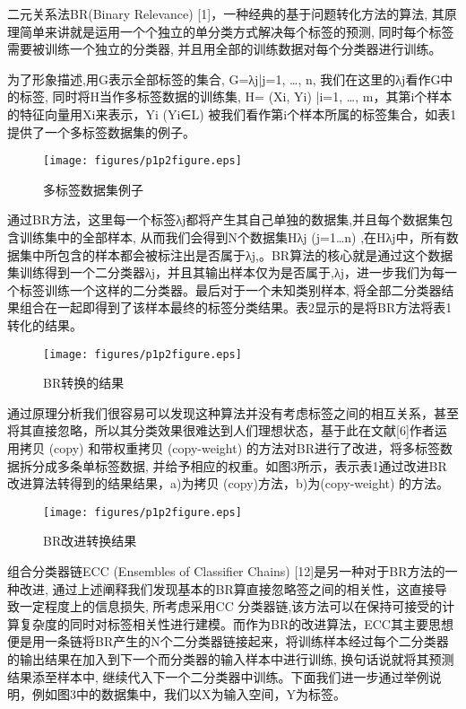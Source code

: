 二元关系法BR(Binary Relevance) [1]，一种经典的基于问题转化方法的算法, 其原理简单来讲就是运用一个个独立的单分类方式解决每个标签的预测, 同时每个标签需要被训练一个独立的分类器, 并且用全部的训练数据对每个分类器进行训练。

为了形象描述,用G表示全部标签的集合, G={λj|j=1, …, n}, 我们在这里的λj看作G中的标签, 同时将H当作多标签数据的训练集, H={ (Xi, Yi) |i=1, …, m}，其第i个样本的特征向量用Xi来表示，Yi (Yi∈L) 被我们看作第i个样本所属的标签集合，如表1提供了一个多标签数据集的例子。

\begin{figure}[htbp!]
	\centering
	\texttt{[image: figures/p1p2figure.eps]}
	\caption{多标签数据集例子}\label{fig:simuP1P2Result}
	\vspace{-1em}
\end{figure}

通过BR方法，这里每一个标签λj都将产生其自己单独的数据集,并且每个数据集包含训练集中的全部样本, 从而我们会得到N个数据集Hλj (j=1…n) ,在Hλj中，所有数据集中所包含的样本都会被标注出是否属于λj,。BR算法的核心就是通过这个数据集训练得到一个二分类器λj，并且其输出样本仅为是否属于,λj，进一步我们为每一个标签训练一个这样的二分类器。最后对于一个未知类别样本, 将全部二分类器结果组合在一起即得到了该样本最终的标签分类结果。表2显示的是将BR方法将表1转化的结果。

\begin{figure}[htbp!]
	\centering
	\texttt{[image: figures/p1p2figure.eps]}
	\caption{BR转换的结果}\label{fig:simuP1P2Result}
	\vspace{-1em}
\end{figure}

通过原理分析我们很容易可以发现这种算法并没有考虑标签之间的相互关系，甚至将其直接忽略，所以其分类效果很难达到人们理想状态，基于此在文献[6]作者运用拷贝 (copy) 和带权重拷贝 (copy-weight) 的方法对BR进行了改进，将多标签数据拆分成多条单标签数据, 并给予相应的权重。如图3所示，表示表1通过改进BR改进算法转得到的结果结果，a)为拷贝 (copy)方法，b)为(copy-weight) 的方法。

\begin{figure}[htbp!]
	\centering
	\texttt{[image: figures/p1p2figure.eps]}
	\caption{BR改进转换结果}\label{fig:simuP1P2Result}
	\vspace{-1em}
\end{figure}

组合分类器链ECC (Ensembles of Classifier Chains) [12]是另一种对于BR方法的一种改进, 通过上述阐释我们发现基本的BR算直接忽略签之间的相关性，这直接导致一定程度上的信息损失, 所考虑采用CC 分类器链,该方法可以在保持可接受的计算复杂度的同时对标签相关性进行建模。而作为BR的改进算法，ECC其主要思想便是用一条链将BR产生的N个二分类器链接起来，将训练样本经过每个二分类器的输出结果在加入到下一个而分类器的输入样本中进行训练, 换句话说就将其预测结果添至样本中, 继续代入下一个二分类器中训练。下面我们进一步通过举例说明，例如图3中的数据集中，我们以X为输入空间，Y为标签。

